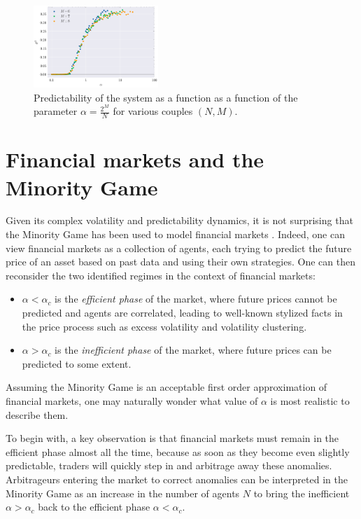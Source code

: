 \documentclass[a4paper, amsfonts, amssymb, amsmath, reprint, showkeys, nofootinbib, twoside]{revtex4-1}
\begin{document}
\begin{figure}[H]
    \centering
    \includegraphics[width=0.42\textwidth]{figures/predictability.png}
    \caption{Predictability of the system as a function as a function of the parameter $\alpha = \frac{2^M}{N}$ for various couples $(N, M)$.}
    \label{fig:predictability}
\end{figure}


\section{Financial markets and the Minority Game}
\label{sec:financial-markets}

Given its complex volatility and predictability dynamics, it is not surprising that the Minority Game has been used to model financial markets \cite{Challet_2004}. Indeed, one can view financial markets as a collection of agents, each trying to predict the future price of an asset based on past data and using their own strategies. One can then reconsider the two identified regimes in the context of financial markets:
\begin{itemize}
    \item $\alpha < \alpha_c$ is the \textit{efficient phase} of the market, where future prices cannot be predicted and agents are correlated, leading to well-known stylized facts in the price process such as excess volatility and volatility clustering.
    \item $\alpha > \alpha_c$ is the \textit{inefficient phase} of the market, where future prices can be predicted to some extent.
\end{itemize}
Assuming the Minority Game is an acceptable first order approximation of financial markets, one may naturally wonder what value of $\alpha$ is most realistic to describe them.

To begin with, a key observation is that financial markets must remain in the efficient phase almost all the time, because as soon as they become even slightly predictable, traders will quickly step in and arbitrage away these anomalies. Arbitrageurs entering the market to correct anomalies can be interpreted in the Minority Game as an increase in the number of agents $N$ to bring the inefficient $\alpha > \alpha_c$ back to the efficient phase $\alpha < \alpha_c$.
\end{document}
